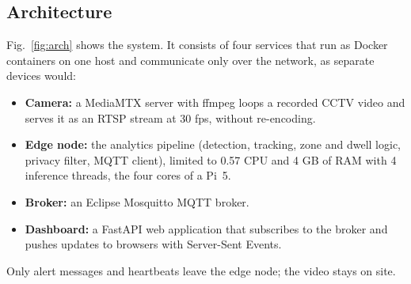 \documentclass[conference]{IEEEtran}
\begin{document}
\subsection{Architecture}
Fig.~\ref{fig:arch} shows the system. It consists of four services that run as Docker containers on one host and communicate only over the network, as separate devices would:
\begin{itemize}
\item \textbf{Camera:} a MediaMTX server with ffmpeg loops a recorded CCTV video and serves it as an RTSP stream at 30 fps, without re-encoding.
\item \textbf{Edge node:} the analytics pipeline (detection, tracking, zone and dwell logic, privacy filter, MQTT client), limited to 0.57 CPU and 4 GB of RAM with 4 inference threads, the four cores of a Pi~5.
\item \textbf{Broker:} an Eclipse Mosquitto MQTT broker.
\item \textbf{Dashboard:} a FastAPI web application that subscribes to the broker and pushes updates to browsers with Server-Sent Events.
\end{itemize}
Only alert messages and heartbeats leave the edge node; the video stays on site.
\end{document}
